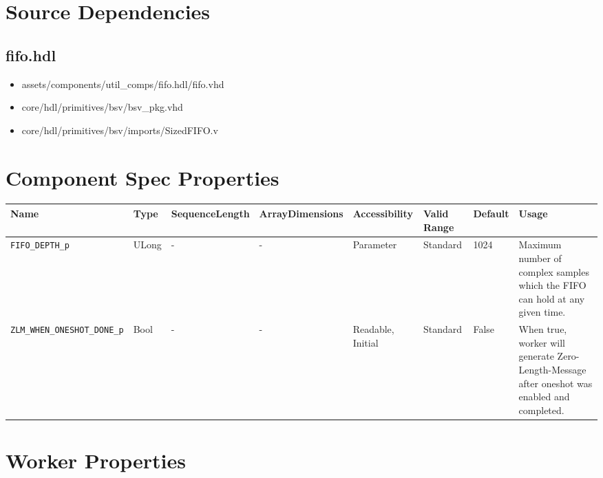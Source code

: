 \documentclass{article}
\def\comp{fifo}
\begin{document}
\section*{Source Dependencies}
\subsection*{\comp.hdl}
\begin{itemize}
  \item assets/components/util\_comps/fifo.hdl/fifo.vhd
  \item core/hdl/primitives/bsv/bsv\_pkg.vhd
  \item core/hdl/primitives/bsv/imports/SizedFIFO.v
\end{itemize}

\begin{landscape}
  \section*{Component Spec Properties}
  \begin{scriptsize}
    \begin{tabular}{|p{4cm}|p{1cm}|p{2cm}|p{2cm}|p{2cm}|p{2cm}|p{1cm}|p{5.5cm}|}
      \hline
      \rowcolor{blue}
      Name               & Type   & SequenceLength & ArrayDimensions   & Accessibility       & Valid Range                                                                      & Default & Usage                                                                        \\
      \hline
      \verb+FIFO_DEPTH_p+  & ULong  & -              & -                 & Parameter & Standard                                                                              & 1024      & Maximum number of complex samples which the FIFO can hold at any given time. \\
      \hline
      \verb+ZLM_WHEN_ONESHOT_DONE_p+        & Bool  & -              & -                 & Readable, Initial            & Standard                                                                         & False       & When true, worker will generate Zero-Length-Message after oneshot was enabled and completed. \\
      \hline
    \end{tabular}
  \end{scriptsize}

  \section*{Worker Properties}

\end{landscape}
\end{document}

